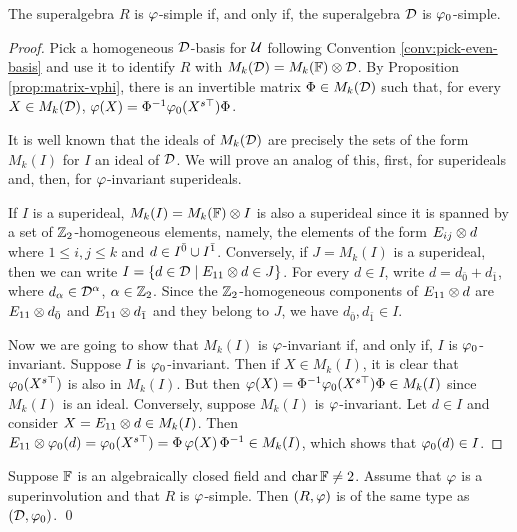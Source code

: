 \begin{prop}
    The superalgebra $R$ is $\varphi$-simple if, and only if, the superalgebra $\mathcal{D}$ is $\varphi_0$-simple.
\end{prop}

\begin{proof}
    Pick a homogeneous $\mathcal{D}$-basis for $\mathcal U$ following Convention \ref{conv:pick-even-basis} and use it to identify $R$ with $M_k(\mathcal{D}) = M_k(\mathbb{F}) \otimes \mathcal{D}$. 
    By Proposition \ref{prop:matrix-vphi}, there is an invertible matrix $\Phi \in M_k(\mathcal{D})$ such that, for every $X \in M_k(\mathcal{D})$,
    $\varphi(X) = \Phi^{-1} \varphi_0(X^{s\top}) \Phi$.
    
    It is well known that the ideals of $M_k(\mathcal{D})$ are precisely the sets of the form $M_k(I)$ for $I$ an ideal of $\mathcal{D}$. 
    We will prove an analog of this, first, for superideals and, then, for $\varphi$-invariant superideals.
    
    If $I$ is a superideal, $M_k(I) = M_k(\mathbb{F}) \otimes I$ is also a superideal since it is spanned by a set of $\mathbb{Z}_2$-homogeneous elements, namely, the elements of the form $E_{ij}\otimes d$ where $1 \leq i,j \leq k$ and $d \in I^{\bar0} \cup I^{\bar1}$. 
    Conversely, if $J = M_k(I)$ is a superideal, then we can write $I = \{ d\in  \mathcal{D} \mid E_{11}\otimes d \in J\}$. 
    For every $d\in I$, write $d = d_{\bar 0} + d_{\bar 1}$, where $d_\alpha \in \mathcal{D}^\alpha$, $\alpha \in \mathbb{Z}_2$. 
    Since the $\mathbb{Z}_2$-homogeneous components of $E_{11}\otimes d$ are $E_{11}\otimes d_{\bar 0}$ and $E_{11}\otimes d_{\bar 1}$ and they belong to $J$, we have $d_{\bar 0}, d_{\bar 1} \in I$.
    
    Now we are going to show that $M_k(I)$ is $\varphi$-invariant if, and only if, $I$ is $\varphi_0$-invariant. 
    Suppose $I$ is $\varphi_0$-invariant.
    Then if $X \in M_k(I)$, it is clear that $\varphi_0 (X^{s\top})$ is also in $M_k(I)$. 
    But then $\varphi(X) = \Phi^{-1} \varphi_0(X^{s\top}) \Phi \in M_k(I)$ since $M_k(I)$ is an ideal. 
    Conversely, suppose $M_k(I)$ is $\varphi$-invariant. 
    Let $d \in I$ and consider $X = E_{11} \otimes d \in M_k(I)$.
    Then $E_{11} \otimes \varphi_0(d) = \varphi_0(X^{s\top}) = \Phi\, \varphi(X)\, \Phi^{-1} \in M_k(I)$, which shows that $\varphi_0(d) \in I$.
\end{proof}

\begin{cor}\label{cor:D-has-the-same-type}
    Suppose $\mathbb{F}$ is an algebraically closed field and $\operatorname{char} \mathbb{F} \neq 2$. 
    Assume that $\varphi$ is a superinvolution and that $R$ is $\varphi$-simple. 
    Then $(R, \varphi)$ is of the same type as $(\mathcal{D}, \varphi_0)$. \qed
\end{cor}

